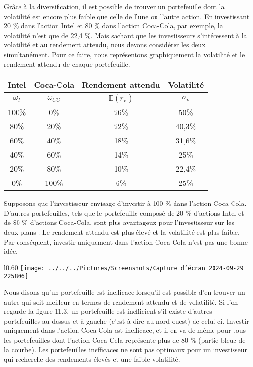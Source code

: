 \documentclass[a4paper, 12pt]{report}
\begin{document}
Grâce à la diversification, il est possible de trouver un portefeuille dont la volatilité est encore plus faible que celle de l'une ou l'autre action. En investissant 20 \% dans l'action Intel et 80 \% dans l'action Coca-Cola, par exemple, la volatilité n'est que de 22,4 \%. Mais sachant que les investisseurs s'intéressent à la volatilité et au rendement attendu, nous devons considérer les deux simultanément. Pour ce faire, nous représentons graphiquement la volatilité et le rendement attendu de chaque portefeuille.
\begin{center}
	\begin{tabular}{@{}cccc@{}}
		\toprule
		Intel               & Coca-Cola     & Rendement attendu & Volatilité \\ \midrule
		\textit{$\omega_I$} & $\omega_{CC}$ & $\mathbb{E}(r_p)$ & $\sigma_p$ \\
		100\%               & 0\%           & 26\%              & 50\%       \\
		80\%                & 20\%          & 22\%              & 40,3\%     \\
		60\%                & 40\%          & 18\%              & 31,6\%     \\
		40\%                & 60\%          & 14\%              & 25\%       \\
		20\%                & 80\%          & 10\%              & 22,4\%     \\
		0\%                 & 100\%         & 6\%               & 25\%       \\ \bottomrule
	\end{tabular}
\end{center}

Supposons que l'investisseur envisage d'investir à 100 \% dans l'action Coca-Cola. D'autres portefeuilles, tels que le portefeuille composé de 20 \% d'actions Intel et de 80 \% d'actions Coca-Cola, sont plus avantageux pour l'investisseur sur les deux plans : Le rendement attendu est plus élevé et la volatilité est plus faible. Par conséquent, investir uniquement dans l'action Coca-Cola n'est pas une bonne idée.
\newpage
\begin{wrapfigure}{l}{0.60\textwidth}
	\centering
	\texttt{[image: ../../../Pictures/Screenshots/Capture d'écran 2024-09-29 225806]}
\end{wrapfigure}
Nous disons qu'un portefeuille est inefficace lorsqu'il est possible d'en trouver un autre qui soit meilleur en termes de rendement attendu et de volatilité. Si l'on regarde la figure 11.3, un portefeuille est inefficient s'il existe d'autres portefeuilles au-dessus et à gauche (c'est-à-dire au nord-ouest) de celui-ci. Investir uniquement dans l'action Coca-Cola est inefficace, et il en va de même pour tous les portefeuilles dont l'action Coca-Cola représente plus de 80 \% (partie bleue de la courbe). Les portefeuilles inefficaces ne sont pas optimaux pour un investisseur qui recherche des rendements élevés et une faible volatilité.
\end{document}
